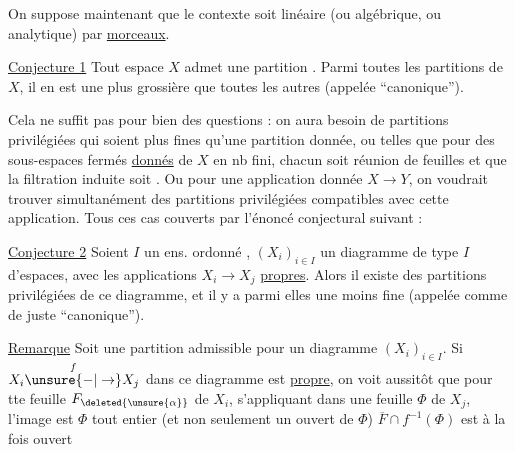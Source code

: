 
On suppose maintenant que le contexte soit linéaire (ou algébrique, ou analytique) par \uline{morceaux}.

\uline{Conjecture 1} Tout espace $X$ admet une partition . Parmi toutes les partitions  de $X$, il en est une plus grossière que toutes les autres (appelée ``canonique'').

Cela ne suffit pas pour bien des questions : on aura besoin de partitions privilégiées qui  soient plus fines qu'une partition  donnée,  ou telles que  pour des sous-espaces fermés \uline{donnés}  de $X$ en nb fini, chacun soit réunion de feuilles et que la filtration induite soit . Ou pour une application donnée $X\to Y$, on voudrait trouver simultanément des partitions privilégiées compatibles avec cette application. Tous ces cas  couverts par l'énoncé conjectural suivant :

\uline{Conjecture 2} Soient $I$ un ens. ordonné , $(X_i)_{i\in I}$ un diagramme de type $I$ d'espaces, avec les applications $X_i\to X_j$ \uline{propres}. Alors il existe des partitions privilégiées de ce diagramme, et il y a parmi elles une moins fine (appelée comme de juste ``canonique'').

\uline{Remarque} Soit une  partition admissible pour un diagramme $(X_i)_{i\in I}$. Si $X_i\overset{f}{\unsure{-|\to}}X_j$ dans ce diagramme est \uline{propre}, on voit aussitôt que pour tte feuille $F_{\deleted{\unsure{\alpha}}}$ de $X_i$, s'appliquant  dans une feuille $\Phi$ de $X_j$, l'image est $\Phi$ tout entier (et non seulement un ouvert de $\Phi$)   $\overline F\cap f^{-1}(\Phi)$ est à la fois ouvert 

